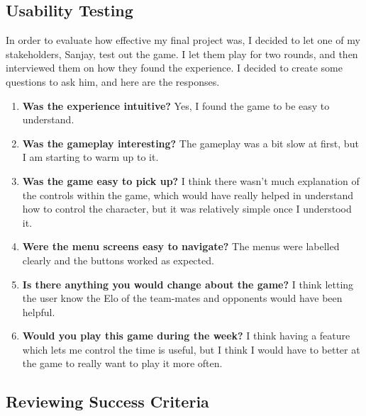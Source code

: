 \subsection{Usability Testing}

In order to evaluate how effective my final project was, I decided to let one of my stakeholders, Sanjay, test out the game. I let them play for two rounds, and then interviewed them on how they found the experience. I decided to create some questions to ask him, and here are the responses.

\begin{enumerate}[label=\arabic*)]
    \item \textbf{Was the experience intuitive?} Yes, I found the game to be easy to understand.
    \item \textbf{Was the gameplay interesting?} The gameplay was a bit slow at first, but I am starting to warm up to it.
    \item \textbf{Was the game easy to pick up?} I think there wasn't much explanation of the controls within the game, which would have really helped in understand how to control the character, but it was relatively simple once I understood it.
    \item \textbf{Were the menu screens easy to navigate?} The menus were labelled clearly and the buttons worked as expected.
    \item \textbf{Is there anything you would change about the game?} I think letting the user know the Elo of the team-mates and opponents would have been helpful.
    \item \textbf{Would you play this game during the week?} I think having a feature which lets me control the time is useful, but I think I would have to better at the game to really want to play it more often.
\end{enumerate}

\subsection{Reviewing Success Criteria}

